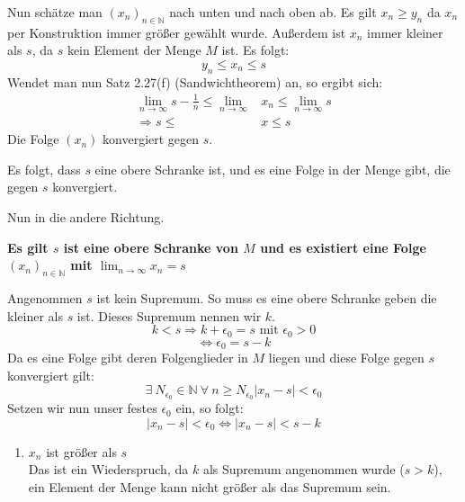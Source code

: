 \documentclass{article}
\begin{document}
\begin{enumerate}[ label= (\alph*) ]
\begin{enumerate}[ label = \arabic*. Fall ]
            Nun schätze man \({(x_n)}_{n \in \mathbb{N}}\) nach unten und nach oben ab. Es gilt \(x_n \geq y_n\) da \(x_n\) per Konstruktion immer größer gewählt wurde.
            Außerdem ist \(x_n\) immer kleiner als \(s\), da \(s\) kein Element der Menge \(M\) ist.
            Es folgt:
            \[ y_n \leq x_n \leq s \]
            Wendet man nun Satz 2.27(f) (Sandwichtheorem) an, so ergibt sich:
            \begin{align*}
                \lim_{n \to \infty} s - \frac{1}{n} \leq \lim_{n \to \infty} &x_n \leq \lim_{n \to \infty} s \\
                \Rightarrow s \leq &x \leq s
            \end{align*}
            Die Folge \((x_n)\) konvergiert gegen \(s\).
        \end{enumerate}
        Es folgt, dass \(s\) eine obere Schranke ist, und es eine Folge in der Menge gibt, die gegen \(s\) konvergiert.

        Nun in die andere Richtung.
        \begin{center}
            \textbf{Es gilt \(s\) ist eine obere Schranke von \(M\) und es existiert eine Folge \( {(x_n)}_{n \in \mathbb{N}} \) mit \( \lim_{n \to \infty} x_n = s \) }
        \end{center}
        Angenommen \(s\) ist kein Supremum. So muss es eine obere Schranke geben die kleiner als \(s\) ist. Dieses Supremum nennen wir \(k\).
        \[ k < s \Rightarrow k + \epsilon_0 = s \text{ mit } \epsilon_0 > 0 \]
        \[ \Leftrightarrow \epsilon_0 = s - k\]
        Da es eine Folge gibt deren Folgenglieder in \(M\) liegen und diese Folge gegen \(s\) konvergiert gilt:
        \[ \exists \: N_{\epsilon_0} \in \mathbb{N} \: \forall \: n \geq N_{\epsilon_0}  |x_n - s| < \epsilon_0 \]
        Setzen wir nun unser festes \( \epsilon_0 \) ein, so folgt:
        \[ |x_n - s| < \epsilon_0 \Leftrightarrow |x_n - s| < s - k \]
        
        \begin{enumerate}[ label = \arabic*. Fall ]
            \item \(x_n\) ist größer als \(s\) \\
            Das ist ein Wiederspruch, da \(k\) als Supremum angenommen wurde (\(s > k\)), ein Element der Menge kann nicht größer als das Supremum sein.


\end{enumerate}
\end{enumerate}
\end{document}
